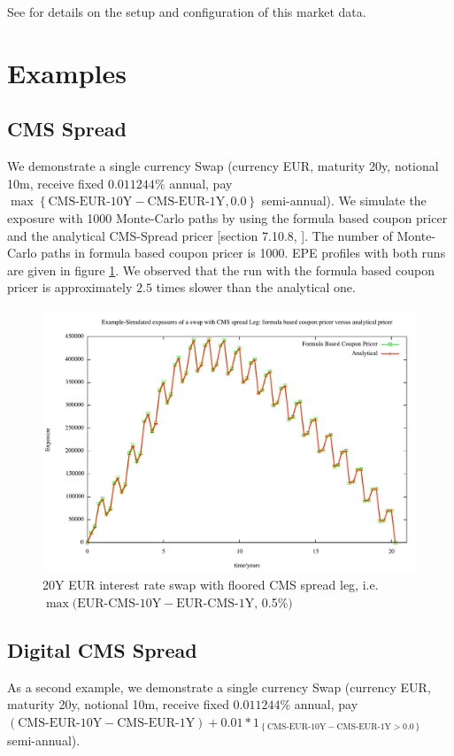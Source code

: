 \documentclass[12pt, a4paper]{article}
\begin{document}
See \cite{oreug} for details on the setup and configuration of this market data.

\section{Examples}

\subsection{CMS Spread}
We demonstrate a single currency Swap (currency EUR, maturity 20y, notional 10m, receive fixed $0.011244\%$ annual, pay
$\max \left\{ \text{CMS-EUR-10Y}- \text{CMS-EUR-1Y}, 0.0 \right \}$ semi-annual).
%
We simulate the exposure with 1000 Monte-Carlo paths by using the formula based coupon pricer and the analytical
CMS-Spread pricer [section 7.10.8, \cite{oreug}]. The number of Monte-Carlo paths in formula based coupon pricer is
1000. EPE profiles with both runs are given in figure \ref{fig:MC1K}. We observed that the run with the formula based
coupon pricer is approximately $2.5$ times slower than the analytical one.
%
\begin{figure}
\includegraphics[scale=0.55]{MC1K.pdf}
\caption{20Y EUR interest rate swap with floored CMS spread leg, i.e.
  $\max(\text{EUR-CMS-10Y} - \text{EUR-CMS-1Y},\, $0.5\%$) $ }
\label{fig:MC1K}
\end{figure}

\subsection{Digital CMS Spread}
As a second example, we demonstrate a single currency Swap (currency EUR, maturity 20y, notional 10m, receive fixed
$0.011244\%$ annual, pay
$\left(\text{CMS-EUR-10Y}- \text{CMS-EUR-1Y} \right)+ 0.01 * 1_{\left\{\text{CMS-EUR-10Y}-
    \text{CMS-EUR-1Y}>0.0\right\}} $ semi-annual).
\end{document}

